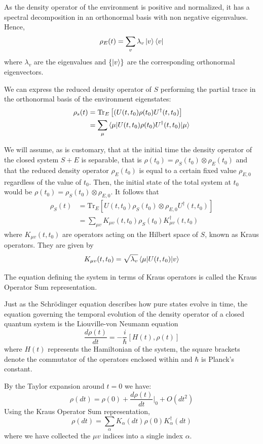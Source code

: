 As the density operator of the environment is positive and normalized, it has a spectral decomposition in an orthonormal basis with non negative eigenvalues. Hence, 
$$\rho_E(t)=\sum_{v}\lambda_v \ket{v}\bra{v}$$
where $\lambda_v$ are the eigenvalues and $\left\lbrace \ket{v}\right \rbrace $ are the corresponding orthonormal eigenvectors.

We can express the reduced density operator of $S$ performing the partial trace in the orthonormal basis of the environment eigenstates:
\begin{align}
    \rho_s(t)&=\mathrm{Tr}_E\left[(U(t,t_0) \rho(t_0) U^{\dag}(t,t_0)\right] \\
    &= \sum_{\mu} \braket{\mu | U(t,t_0) \rho(t_0) U^{\dag}(t,t_0) | \mu}
\end{align}

We will assume, as is customary, that at the initial time the density operator of the closed system $S+E$ is separable, that is $\rho(t_0) = \rho_S(t_0)\otimes \rho_E(t_0)$ and that the reduced density operator $\rho_E(t_0)$ is equal to a certain fixed value $\rho_{E,0}$ regardless of the value of $t_0$. Then, the initial state of the total system at $t_0$ would be $\rho(t_0) = \rho_S(t_0)\otimes \rho_{E,0}$. It follows that
\begin{align}
    \rho_S(t)&=\mathrm{Tr}_E\left[ U(t,t_0) \rho_S(t_0) \otimes \rho_{E,0} U^{\dag}(t,t_0) \right] \\
    &= \sum_{\mu v} K_{\mu v}(t, t_0) \rho_S(t_0) K_{\mu v}^{\dag}(t, t_0) 
\end{align}
where $K_{\mu v}(t,t_0)$ are operators acting on the Hilbert space of $S$, known as Kraus operators. They are given by 
$$K_{\mu v}(t,t_0) = \sqrt{\lambda_v}\braket{\mu | U(t,t_0) | v}$$

The equation defining the system in terms of Kraus operators is called the Kraus Operator Sum representation. 

Just as the Schrödinger equation describes how pure states evolve in time, the equation governing the temporal evolution of the density operator of a closed quantum system is the Liouville-von Neumann equation
\begin{equation}
    \frac{d \rho(t)}{d t} = -\frac{i}{\hbar}\left[ H(t), \rho(t)\right]
\end{equation}
where $H(t)$ represents the Hamiltonian of the system, the square brackets denote the commutator of the operators enclosed within and $\hbar$ is Planck's constant.

By the Taylor expansion around $t=0$ we have:
$$\rho(dt)=\rho(0) + \frac{d \rho (t)}{dt}|_{0} + O(dt^2)$$
Using the Kraus Operator Sum representation,
$$\rho(dt)=\sum_{\alpha} K_{\alpha}(dt) \rho(0) K_{\alpha}^{\dag}(dt)$$
where we have collected the $\mu v$ indices into a single index $\alpha$.

